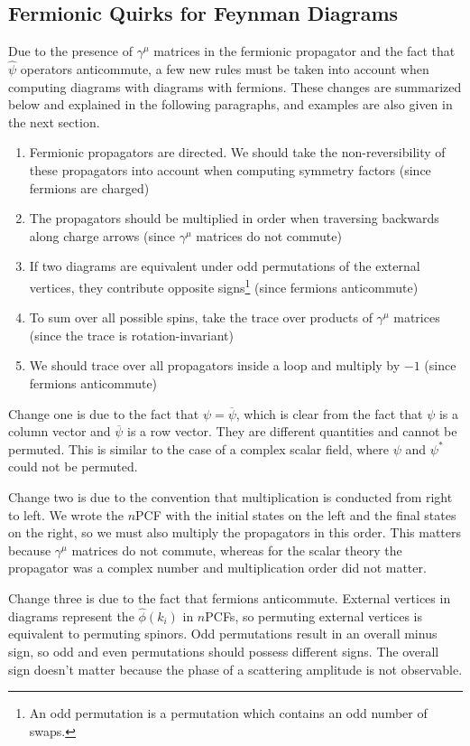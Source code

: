 \subsection{Fermionic Quirks for Feynman Diagrams}
Due to the presence of $\gamma^\mu$ matrices in the fermionic propagator and the fact that $\hat \psi$ operators anticommute, a few new rules must be taken into account when computing diagrams with diagrams with fermions. These changes are summarized below and explained in the following paragraphs, and examples are also given in the next section.
\begin{enumerate}
  \item Fermionic propagators are directed. We should take the non-reversibility of these propagators into account when computing symmetry factors (since fermions are charged)
  \item The propagators should be multiplied in order when traversing backwards along charge arrows (since $\gamma^\mu$ matrices do not commute)
  \item If two diagrams are equivalent under odd permutations of the external vertices, they contribute opposite signs\footnote{An odd permutation is a permutation which contains an odd number of swaps.} (since fermions anticommute)
  \item To sum over all possible spins, take the trace over products of $\gamma^\mu$ matrices (since the trace is rotation-invariant)
  \item We should trace over all propagators inside a loop and multiply by $-1$ (since fermions anticommute)
\end{enumerate}

Change one is due to the fact that $\psi=\overline \psi$, which is clear from the fact that $\psi$ is a column vector and $\overline \psi$ is a row vector. They are different quantities and cannot be permuted. This is similar to the case of a complex scalar field, where $\psi$ and $\psi^*$ could not be permuted.

Change two is due to the convention that multiplication is conducted from right to left. We wrote the $n$PCF with the initial states on the left and the final states on the right, so we must also multiply the propagators in this order. This matters because $\gamma^\mu$ matrices do not commute, whereas for the scalar theory the propagator was a complex number and multiplication order did not matter.

Change three is due to the fact that fermions anticommute. External vertices in diagrams represent the $\hat \phi(k_i)$ in $n$PCFs, so permuting external vertices is equivalent to permuting spinors. Odd permutations result in an overall minus sign, so odd and even permutations should possess different signs. The overall sign doesn't matter because the phase of a scattering amplitude is not observable.

